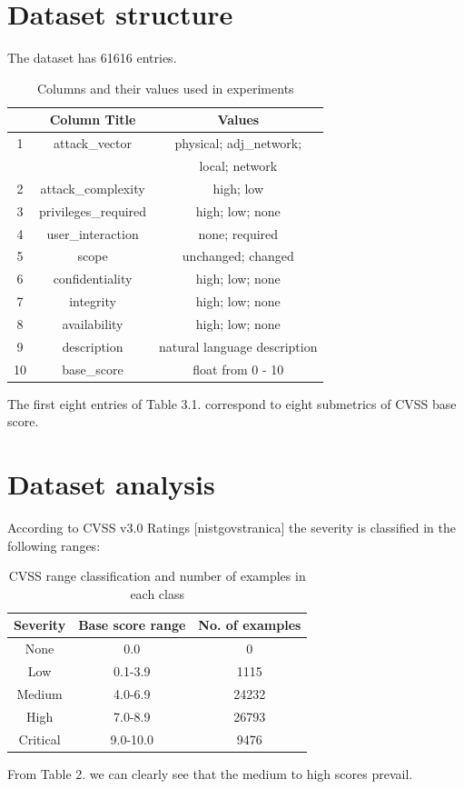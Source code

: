\documentclass[times, utf8, zavrsni, english]{fer}
\begin{document}
\section{Dataset structure}

The dataset has 61616 entries.

\begin{table}[h!]
	\centering
	\begin{tabular}{||c c c ||} 
		\hline
		 & Column Title & Values  \\ [0.5ex] 
		\hline\hline
		
		1 & attack\_vector & physical; adj\_network;   \\
		 & &  local; network \\
		2 & attack\_complexity & high; low  \\
		3 & privileges\_required & high; low; none  \\
		4 & user\_interaction & none; required \\ 
		5 & scope & unchanged; changed \\ 
		6 & confidentiality & high; low; none  \\
		7 & integrity & high; low; none  \\
		8 & availability & high; low; none  \\
		
		\hline\hline
		9 & description & natural language description \\
		10 & base\_score & float from 0 - 10 \\
		\hline
	\end{tabular}
\caption{Columns and their values used in experiments}
\label{table:1}
\end{table}

The first eight entries of Table 3.1. correspond to eight submetrics of CVSS base score.
\section{Dataset analysis}
According to CVSS v3.0 Ratings [nistgovstranica] the severity is classified in the following ranges:
\begin{table}[h!]
	\centering
	\begin{tabular}{| c c c ||} 
		\hline
		Severity & Base score range & No. of examples\\ [0.5ex] 
		\hline\hline
		
		None & 0.0 & 0  \\
		Low &  0.1-3.9 & 1115 \\
		Medium & 4.0-6.9 & 24232  \\
		High & 7.0-8.9  & 26793 \\
		Critical & 9.0-10.0 & 9476\\
		\hline
	\end{tabular}
	\caption{CVSS range classification and number of examples in each class}
	\label{table:2}
\end{table}
From Table 2. we can clearly see that the medium to high scores prevail. 
\end{document}
